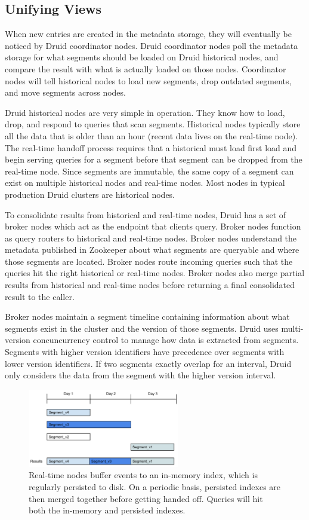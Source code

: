 \documentclass{vldb}
\begin{document}
\subsection{Unifying Views}
When new entries are created in the metadata storage, they will eventually be
noticed by Druid coordinator nodes. Druid coordinator nodes poll the metadata
storage for what segments should be loaded on Druid historical nodes, and
compare the result with what is actually loaded on those nodes. Coordinator
nodes will tell historical nodes to load new segments, drop outdated segments,
and move segments across nodes.

Druid historical nodes are very simple in operation. They know how to load,
drop, and respond to queries that scan segments. Historical nodes typically
store all the data that is older than an hour (recent data lives on the
real-time node). The real-time handoff process requires that a historical must
load first load and begin serving queries for a segment before that segment can
be dropped from the real-time node. Since segments are immutable, the same copy
of a segment can exist on multiple historical nodes and real-time nodes. Most
nodes in typical production Druid clusters are historical nodes.

To consolidate results from historical and real-time nodes, Druid has a set of
broker nodes which act as the endpoint that clients query. Broker nodes
function as query routers to historical and real-time nodes. Broker nodes
understand the metadata published in Zookeeper about what segments are
queryable and where those segments are located. Broker nodes route incoming
queries such that the queries hit the right historical or real-time nodes.
Broker nodes also merge partial results from historical and real-time nodes
before returning a final consolidated result to the caller.

Broker nodes maintain a segment timeline containing information about what
segments exist in the cluster and the version of those segments. Druid uses
multi-version concuncurrency control to manage how data is extracted from
segments. Segments with higher version identifiers have precedence over
segments with lower version identifiers. If two segments exactly overlap for an
interval, Druid only considers the data from the segment with the higher
version interval.

\begin{figure}
\centering
\includegraphics[width = 2.6in]{timeline}
\caption{Real-time nodes buffer events to an in-memory index, which is
regularly persisted to disk. On a periodic basis, persisted indexes are then merged
together before getting handed off.
Queries will hit both the in-memory and persisted indexes.
}
\label{fig:timeline}
\end{figure}
\end{document}
